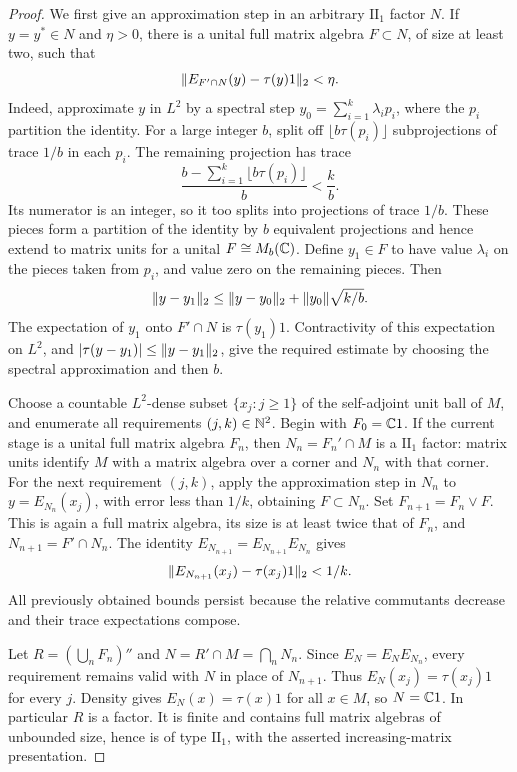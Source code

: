 \begin{proof}
We first give an approximation step in an arbitrary \(\mathrm{II}_1\)
factor \(N\).  If \(y=y^*\in N\) and \(\eta>0\), there is a unital full
matrix algebra \(F\subset N\), of size at least two, such that
\[
 \lVert E_{F'\cap N}(y)-\tau(y)1\rVert_2<\eta.
\]
Indeed, approximate \(y\) in \(L^2\) by a spectral step
\(y_0=\sum_{i=1}^k\lambda_i p_i\), where the \(p_i\) partition the
identity.  For a large integer \(b\), split off
\(\lfloor b\tau(p_i)\rfloor\) subprojections of trace \(1/b\) in each
\(p_i\).  The remaining projection has trace
\[
 \frac{b-\sum_{i=1}^k\lfloor b\tau(p_i)\rfloor}{b}<\frac{k}{b}.
\]
Its numerator is an integer, so it too splits into projections of trace
\(1/b\).  These pieces form a partition of the identity by \(b\)
equivalent projections and hence extend to matrix units for a unital
\(F\cong M_b(\mathbb C)\).  Define \(y_1\in F\) to have value \(\lambda_i\)
on the pieces taken from \(p_i\), and value zero on the remaining pieces.
Then
\[
 \lVert y-y_1\rVert_2
 \leq \lVert y-y_0\rVert_2+\lVert y_0\rVert\sqrt{k/b}.
\]
The expectation of \(y_1\) onto \(F'\cap N\) is \(\tau(y_1)1\).
Contractivity of this expectation on \(L^2\), and
\(\lvert\tau(y-y_1)\rvert\leq\lVert y-y_1\rVert_2\), give the required estimate
by choosing the spectral approximation and then \(b\).

Choose a countable \(L^2\)-dense subset \(\{x_j:j\geq1\}\) of the
self-adjoint unit ball of \(M\), and enumerate all requirements
\((j,k)\in\mathbb N^2\).  Begin with \(F_0=\mathbb C1\).  If the current stage is
a unital full matrix algebra \(F_n\), then
\(N_n=F_n'\cap M\) is a \(\mathrm{II}_1\) factor: matrix units identify
\(M\) with a matrix algebra over a corner and \(N_n\) with that corner.
For the next requirement \((j,k)\), apply the approximation step in
\(N_n\) to \(y=E_{N_n}(x_j)\), with error less than \(1/k\), obtaining
\(F\subset N_n\).  Set \(F_{n+1}=F_n\vee F\).  This is again a full
matrix algebra, its size is at least twice that of \(F_n\), and
\(N_{n+1}=F'\cap N_n\).  The identity
\(E_{N_{n+1}}=E_{N_{n+1}}E_{N_n}\) gives
\[
 \lVert E_{N_{n+1}}(x_j)-\tau(x_j)1\rVert_2<1/k.
\]
All previously obtained bounds persist because the relative commutants
decrease and their trace expectations compose.

Let \(R=(\bigcup_nF_n)''\) and \(N=R'\cap M=\bigcap_nN_n\).
Since \(E_N=E_NE_{N_n}\), every requirement remains valid with \(N\)
in place of \(N_{n+1}\).  Thus \(E_N(x_j)=\tau(x_j)1\) for every
\(j\).  Density gives \(E_N(x)=\tau(x)1\) for all \(x\in M\), so
\(N=\mathbb C1\).  In particular \(R\) is a factor.  It is finite and contains
full matrix algebras of unbounded size, hence is of type
\(\mathrm{II}_1\), with the asserted increasing-matrix presentation.
\end{proof}

